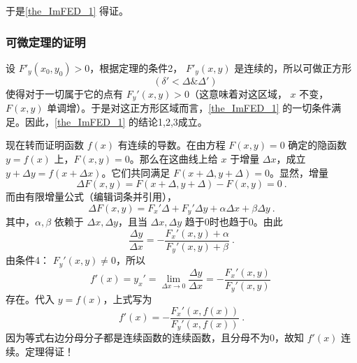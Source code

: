 于是\autoref{the_ImFED_1} 得证。
\subsubsection{可微定理的证明}
设 $F'_y(x_0,y_0)>0$，根据定理的条件2， $F'_y(x,y)$ 是连续的，所以可做正方形
\begin{equation}
[x_0-\delta',x_0+\delta';y_0-\delta',y_0+\delta']\quad(\delta'<\Delta \&\Delta')~
\end{equation}
使得对于一切属于它的点有 $F_y'(x,y)>0$（这意味着对这区域， $x$ 不变，$F(x,y)$ 单调增）。于是对这正方形区域而言，\autoref{the_ImFED_1} 的一切条件满足。因此，\autoref{the_ImFED_1} 的结论1,2,3成立。

现在转而证明函数 $f(x)$ 有连续的导数。在由方程 $F(x,y)=0$ 确定的隐函数 $y=f(x)$ 上，$F(x,y)=0$。那么在这曲线上给 $x$ 于增量 $\Delta x$，成立 $y+\Delta y=f(x+\Delta x)$。它们共同满足 $F(x+\Delta,y+\Delta)=0$。显然，增量
\begin{equation}
\Delta F(x,y)=F(x+\Delta,y+\Delta)-F(x,y)=0~.
\end{equation}
而由有限增量公式（编辑词条并引用），
\begin{equation}
\Delta F(x,y)=F_x'\Delta+F_y'\Delta y+\alpha\Delta x+\beta\Delta y~.
\end{equation}
其中，$\alpha,\beta$ 依赖于 $\Delta x,\Delta y$，且当 $\Delta x,\Delta y$ 趋于0时也趋于0。由此
\begin{equation}
\frac{\Delta y}{\Delta x}=-\frac{F_x'(x,y)+\alpha}{F_y'(x,y)+\beta}~.
\end{equation}
由条件4： $F_y'(x,y)\neq0$，所以
\begin{equation}
f'(x)=y_x'=\lim_{\Delta x\rightarrow 0}\frac{\Delta y}{\Delta x}=-\frac{F_x'(x,y)}{F_y'(x,y)}~
\end{equation}
存在。代入 $y=f(x)$，上式写为
\begin{equation}
f'(x)=-\frac{F_x'(x,f(x))}{F_y'(x,f(x))}~.
\end{equation}
因为等式右边分母分子都是连续函数的连续函数，且分母不为0，故知 $f'(x)$ 连续。定理得证！

